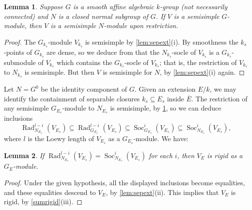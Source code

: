 \documentclass[11pt,reqno]{amsart}
\newtheorem{lemma}{Lemma}[subsection]
\theoremstyle{definition}
\theoremstyle{remark}
\theoremstyle{definition}
\theoremstyle{plain}
\DeclareMathOperator{\Rad}{Rad}
\DeclareMathOperator{\Soc}{Soc}
\begin{document}
\begin{lemma}\label{clifford}
Suppose $G$ is a smooth affine algebraic $k$-group (not necessarily connected) and $N$ is a closed normal subgroup of $G$.
If $V$ is a semisimple $G$-module, then $V$ is a semisimple $N$-module upon restriction.
\end{lemma}

\begin{proof}
The $G_{k_s}$-module $V_{k_s}$ is semisimple by \cref{lem:sepext}(i).
By smoothness the $k_s$-points of $G_{k_s}$ are dense, so we deduce from \cite[I.6.16]{Jan03}
that the $N_{k_s}$-socle of $V_{k_s}$ is a $G_{k_s}$-submodule of $V_{k_s}$ which contains the $G_{k_s}$-socle
of $V_{k_s}$; that is, the restriction of $V_{k_s}$ to $N_{k_s}$ is semisimple.
But then $V$ is semisimple for $N$, by \cref{lem:sepext}(i) again.
\end{proof}

Let $N = G^0$ be the identity component of $G$.
Given an extension $E/k$, we may identify the containment of separable closures $k_s\subseteq E_s$ inside $\overline{E}$.
The restriction of any semisimple $G_{E_s}$-module to $N_{E_s}$ is semisimple, by \cref{clifford}, 
so we can deduce inclusions 
\begin{equation}\label{eq:nest}
\Rad^{l-i}_{N_{E_s}}(V_{E_s}) \subseteq \Rad^{l-i}_{G_{E_s}}(V_{E_s}) \subseteq \Soc^i_{G_{E_s}}(V_{E_s}) \subseteq \Soc^i_{N_{E_s}}(V_{E_s}),
\end{equation}
where $l$ is the Loewy length of $V_{E_s}$ as a $G_{E_s}$-module.
We have:
\begin{lemma}\label{lem:enoughalready}
If $\Rad^{l-i}_{N_{E_s}}(V_{E_s}) = \Soc^i_{N_{E_s}}(V_{E_s})$ for each $i$, then $V_E$ is rigid as a $G_E$-module.
\end{lemma}

\begin{proof}
Under the given hypothesis, all the displayed inclusions become equalities, and these equalities descend to $V_E$, by \cref{lem:sepext}(ii).
This implies that $V_E$ is rigid, by \cref{sumrigid}(iii).
\end{proof}  
\end{document}
